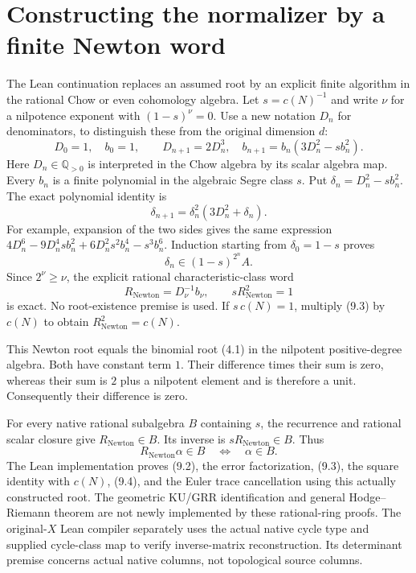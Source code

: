 \documentclass[11pt]{article}
\newcommand{\Q}{\mathbb Q}
\begin{document}
\section{Constructing the normalizer by a finite Newton word}
The Lean continuation replaces an assumed root by an explicit
finite algorithm in the rational Chow or even cohomology algebra.
Let $s=c(N)^{-1}$ and write $\nu$ for a nilpotence exponent with $(1-s)^\nu=0$.
Use a new notation $D_n$ for denominators, to distinguish these
from the original dimension $d$:
\[
 D_0=1,\quad b_0=1,\qquad
 D_{n+1}=2D_n^3,\quad
 b_{n+1}=b_n(3D_n^2-sb_n^2).
 \tag{9.1}
\]
Here $D_n\in\Q_{>0}$ is interpreted in the Chow algebra
by its scalar algebra map. Every $b_n$ is a finite polynomial
in the algebraic Segre class $s$.
Put $\delta_n=D_n^2-sb_n^2$. The exact polynomial identity is
\[
 \boxed{\delta_{n+1}
      =\delta_n^2(3D_n^2+\delta_n).}
 \tag{9.2}
\]
For example, expansion of the two sides gives the same expression
$4D_n^6-9D_n^4sb_n^2+6D_n^2s^2b_n^4-s^3b_n^6$.
Induction starting from $\delta_0=1-s$ proves
\[
 \delta_n\in (1-s)^{2^n}A.
\]
Since $2^\nu\ge\nu$, the explicit rational characteristic-class word
\[
 \boxed{R_{\mathrm{Newton}}=D_\nu^{-1}b_\nu,\qquad
       sR_{\mathrm{Newton}}^2=1}
 \tag{9.3}
\]
is exact. No root-existence premise is used.
If $s\,c(N)=1$, multiply (9.3) by $c(N)$ to obtain
$R_{\mathrm{Newton}}^2=c(N)$.

This Newton root equals the binomial root (4.1) in the
nilpotent positive-degree algebra. Both have constant term $1$.
Their difference times their sum is zero, whereas their sum is
$2$ plus a nilpotent element and is therefore a unit.
Consequently their difference is zero.

For every native rational subalgebra $B$ containing $s$,
the recurrence and rational scalar closure give
$R_{\mathrm{Newton}}\in B$. Its inverse is
$sR_{\mathrm{Newton}}\in B$. Thus
\[
 R_{\mathrm{Newton}}\alpha\in B
       \quad\Longleftrightarrow\quad \alpha\in B.
 \tag{9.4}
\]
The Lean implementation proves (9.2), the error factorization,
(9.3), the square identity with $c(N)$, (9.4), and the Euler
trace cancellation using this actually constructed root.
The geometric KU/GRR identification and general
Hodge--Riemann theorem are not newly implemented by these
rational-ring proofs. The original-$X$ Lean compiler separately
uses the actual native cycle type and supplied cycle-class map
to verify inverse-matrix reconstruction. Its determinant premise
concerns actual native columns, not topological source columns.
\end{document}
